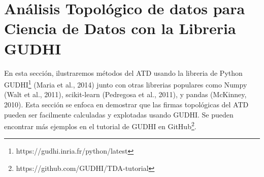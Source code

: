 \chapter{An\'alisis Topol\'ogico de datos para Ciencia de Datos con la Libreria GUDHI}

En esta secci\'on, ilustraremos m\'etodos del ATD usando la libreria de Python
GUDHI\footnote{https://gudhi.inria.fr/python/latest} (Maria et al., 2014\cite{Maria2014})
junto con otras librerias populares como Numpy (Walt et al., 2011\cite{Walt2011}),
scikit-learn (Pedregosa et al., 2011)\cite{Pedregosa2011},
y pandas (McKinney, 2010\cite{McKinney2010}).
Esta secci\'on se enfoca en demostrar que las firmas topol\'ogicas del ATD
pueden ser facilmente calculadas y explotadas usando GUDHI.
Se pueden encontrar m\'as ejemplos en el tutorial de GUDHI en
GitHub\footnote{https://github.com/GUDHI/TDA-tutorial}.